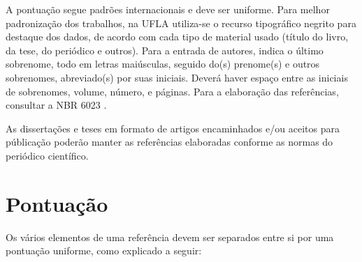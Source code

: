 A pontuação segue padrões internacionais e deve ser uniforme. Para melhor padronização dos trabalhos, na UFLA utiliza-se o recurso tipográfico negrito para destaque dos dados, de acordo com cada tipo de material usado (título do livro, da tese, do periódico e outros). Para a entrada de autores, indica o último sobrenome, todo em letras maiúsculas, seguido do(s) prenome(s) e outros sobrenomes, abreviado(s) por suas iniciais. Deverá haver espaço entre as iniciais de sobrenomes, volume, número, e páginas. Para a elaboração das referências, consultar a NBR 6023 \cite{NBR6023:2002}.

As dissertações e teses em formato de artigos encaminhados e/ou aceitos para públicação poderão manter as referências elaboradas conforme as normas do periódico científico. 


\section{Pontuação}

Os vários elementos de uma referência devem ser separados entre si por uma pontuação uniforme, como explicado a seguir:

